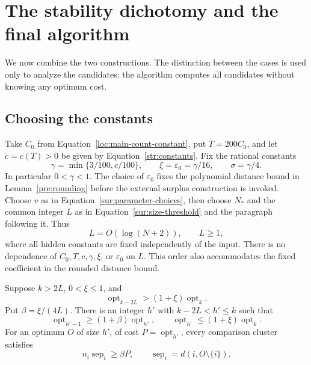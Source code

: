 \section{The stability dichotomy and the final algorithm}
\label{asm:section}

We now combine the two constructions. The distinction between the
cases is used only to analyze the candidates: the algorithm computes
all candidates without knowing any optimum cost.

\subsection{Choosing the constants}

Take $C_0$ from Equation~\eqref{loc:main-count-constant}, put
$T=200C_0$, and let $c=c(T)>0$ be given by
Equation~\eqref{str:constants}. Fix the rational constants
\begin{equation}\label{asm:constants}
 \gamma=\min\{3/100,c/100\},\qquad
 \xi=\varepsilon_0=\gamma/16,\qquad
 \sigma=\gamma/4.
\end{equation}
In particular $0<\gamma<1$. The choice of $\varepsilon_0$ fixes the
polynomial distance bound in Lemma~\ref{pre:rounding} before the
external surplus construction is invoked. Choose $v$ as in
Equation~\eqref{sur:parameter-choices}, then choose $N_*$ and the
common integer $L$ as in Equation~\eqref{sur:size-threshold} and the
paragraph following it. Thus
\[
 L=O(\log(N+2)),\qquad L\ge1,
\]
where all hidden constants are fixed independently of the input.
There is no dependence of $C_0,T,c,\gamma,\xi$, or $\varepsilon_0$
on $L$. This order also accommodates the fixed coefficient in the
rounded distance bound.

\begin{lemma}\label{asm:sensitive}
Suppose $k>2L$, $0<\xi\le1$, and
\[
 \operatorname{opt}_{k-2L}>(1+\xi)\operatorname{opt}_k.
\]
Put $\beta=\xi/(4L)$. There is an integer $h'$ with
$k-2L<h'\le k$ such that
\begin{equation}\label{asm:sensitive-ratios}
 \operatorname{opt}_{h'-1}\ge(1+\beta)\operatorname{opt}_{h'},
 \qquad
 \operatorname{opt}_{h'}\le(1+\xi)\operatorname{opt}_k.
\end{equation}
For an optimum $O$ of size $h'$, of cost
$P=\operatorname{opt}_{h'}$, every comparison cluster satisfies
\begin{equation}\label{asm:separation}
 n_i\operatorname{sep}_i\ge\beta P,
 \qquad \operatorname{sep}_i=d(i,O\setminus\{i\}).
\end{equation}
\end{lemma}

